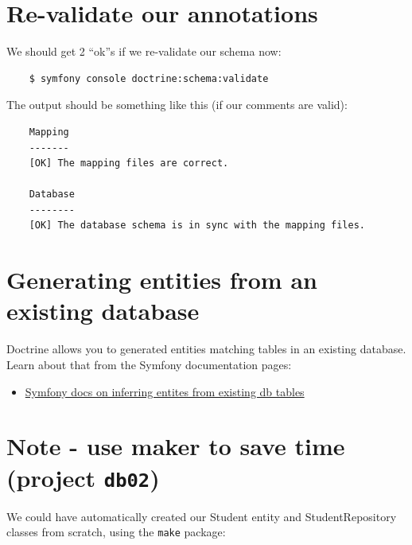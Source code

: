 \documentclass[a4paperpaper,openright]{book}
\providecommand{\tightlist}{%
  \setlength{\itemsep}{0pt}\setlength{\parskip}{0pt}}
\begin{document}
\hypertarget{re-validate-our-annotations}{%
\section{Re-validate our
annotations}\label{re-validate-our-annotations}}

We should get 2 ``ok''s if we re-validate our schema now:

\begin{verbatim}
    $ symfony console doctrine:schema:validate
\end{verbatim}

The output should be something like this (if our comments are valid):

\begin{verbatim}
    Mapping
    -------
    [OK] The mapping files are correct.

    Database
    --------
    [OK] The database schema is in sync with the mapping files.
\end{verbatim}

\hypertarget{generating-entities-from-an-existing-database}{%
\section{Generating entities from an existing
database}\label{generating-entities-from-an-existing-database}}

Doctrine allows you to generated entities matching tables in an existing
database. Learn about that from the Symfony documentation pages:

\begin{itemize}
\tightlist
\item
  \href{https://symfony.com/doc/current/doctrine/reverse_engineering.html}{Symfony
  docs on inferring entites from existing db tables}
\end{itemize}

\hypertarget{note---use-maker-to-save-time-project-db02}{%
\section{\texorpdfstring{Note - use maker to save time (project
\texttt{db02})}{Note - use maker to save time (project db02)}}\label{note---use-maker-to-save-time-project-db02}}

We could have automatically created our Student entity and
StudentRepository classes from scratch, using the \texttt{make} package:
\end{document}
